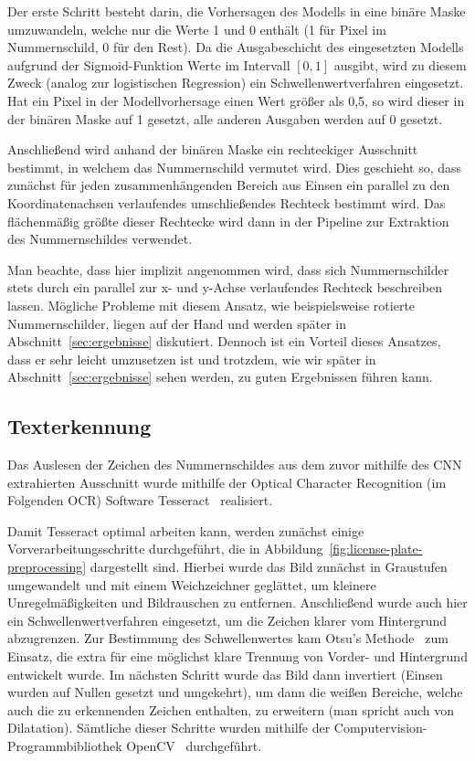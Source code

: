 Der erste Schritt besteht darin, die Vorhersagen des Modells in eine
bin\"are Maske umzuwandeln, welche nur die Werte 1 und 0 enth\"alt
(1 f\"ur Pixel im Nummernschild, 0 f\"ur den Rest).
Da die Ausgabeschicht des eingesetzten Modells aufgrund der
Sigmoid-Funktion Werte im Intervall $[0, 1]$ ausgibt, wird
zu diesem Zweck (analog zur logistischen Regression)
ein Schwellenwertverfahren eingesetzt.
Hat ein Pixel in der Modellvorhersage einen Wert gr\"o{\ss}er als
0,5, so wird dieser in der bin\"aren Maske auf 1 gesetzt, alle
anderen Ausgaben werden auf 0 gesetzt.

Anschlie{\ss}end wird anhand der bin\"aren Maske ein rechteckiger
Ausschnitt bestimmt, in welchem das Nummernschild vermutet wird.
Dies geschieht so, dass zun\"achst f\"ur jeden zusammenh\"angenden
Bereich aus Einsen ein parallel zu den Koordinatenachsen
verlaufendes umschlie{\ss}endes Rechteck bestimmt wird.
Das fl\"achenm\"a{\ss}ig gr\"o{\ss}te dieser Rechtecke wird dann in
der Pipeline zur Extraktion des Nummernschildes verwendet.

Man beachte, dass hier implizit angenommen wird, dass sich
Nummernschilder stets durch ein parallel zur x- und y-Achse
verlaufendes Rechteck beschreiben lassen.
M\"ogliche Probleme mit diesem Ansatz, wie beispielsweise
rotierte Nummernschilder, liegen auf der Hand und werden sp\"ater
in Abschnitt~\ref{sec:ergebnisse} diskutiert.
Dennoch ist ein Vorteil dieses Ansatzes, dass er sehr leicht
umzusetzen ist und trotzdem, wie wir sp\"ater in
Abschnitt~\ref{sec:ergebnisse} sehen werden, zu guten Ergebnissen
f\"uhren kann.

\subsection{Texterkennung}
\label{sec:texterkennung}

Das Auslesen der Zeichen des Nummernschildes aus dem zuvor mithilfe des
CNN extrahierten Ausschnitt wurde mithilfe der
Optical Character Recognition (im Folgenden OCR) Software
Tesseract~\cite{tesseract} realisiert.

Damit Tesseract optimal arbeiten kann, werden zun\"achst
einige Vorverarbeitungsschritte durchgef\"uhrt, die in
Abbildung~\ref{fig:license-plate-preprocessing} dargestellt sind.
Hierbei wurde das Bild zun\"achst in Graustufen umgewandelt und
mit einem Weichzeichner gegl\"attet, um kleinere Unregelm\"a{\ss}igkeiten
und Bildrauschen zu entfernen.
Anschlie{\ss}end wurde auch hier ein Schwellenwertverfahren
eingesetzt, um die Zeichen klarer vom Hintergrund abzugrenzen.
Zur Bestimmung des Schwellenwertes kam Otsu's Methode~\cite{otsu} zum Einsatz,
die extra f\"ur eine
m\"oglichst klare Trennung von Vorder- und Hintergrund
entwickelt wurde. Im n\"achsten Schritt wurde das Bild dann
invertiert (Einsen wurden auf Nullen gesetzt und umgekehrt), um dann
die wei{\ss}en Bereiche, welche auch die zu erkennenden Zeichen
enthalten, zu erweitern (man spricht auch von Dilatation).
S\"amtliche dieser Schritte wurden mithilfe der
Computervision-Programmbibliothek OpenCV~\cite{opencv_library}
durchgef\"uhrt.

